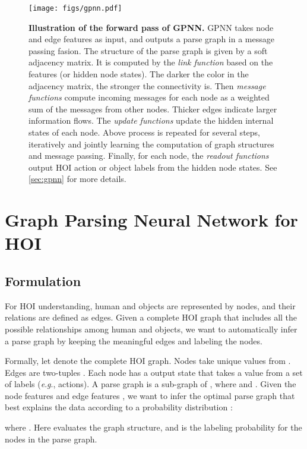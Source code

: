 \documentclass[runningheads]{llncs}
\newcommand{\eg}{\textit{e}.\textit{g}.}
\begin{document}
\begin{figure*}[t]
\centering
\texttt{[image: figs/gpnn.pdf]}
\caption{\textbf{Illustration of the forward pass of GPNN.} GPNN takes node and edge features as input, and outputs a parse graph in a message passing fasion. The structure of the parse graph is given by a soft adjacency matrix. It is computed by the \textit{link function} based on the features (or hidden node states). The darker the color in the adjacency matrix, the stronger the connectivity is. Then \textit{message functions} compute incoming messages for each node as a weighted sum of the messages from other nodes. Thicker edges indicate larger information flows. The \textit{update functions} update the hidden internal states of each node. Above process is repeated for several steps, iteratively and jointly learning the computation of graph structures and message passing. Finally, for each node, the \textit{readout functions} output HOI action or object labels from the hidden node states. See \autoref{sec:gpnn} for more details.}
\label{fig:gpnn}
\end{figure*}




\section{Graph Parsing Neural Network for HOI}
\label{sec:gpnn}





\subsection{Formulation}
\label{sec:gpnn_forward_pass}
For HOI understanding, human and objects are represented by nodes, and their relations are defined as edges. Given a complete HOI graph that includes all the possible relationships among human and objects, we want to automatically infer a parse graph by keeping the meaningful edges and labeling the nodes.

Formally, let  denote the complete HOI graph. Nodes  take unique values from . Edges  are two-tuples . Each node  has a output state  that takes a value from a set of labels  (\eg, actions). A parse graph  is a sub-graph of , where  and . Given the node features  and edge features , we want to infer the optimal parse graph  that best explains the data according to a probability distribution :

where . Here  evaluates the graph structure, and  is the labeling probability for the nodes in the parse graph.
\end{document}
